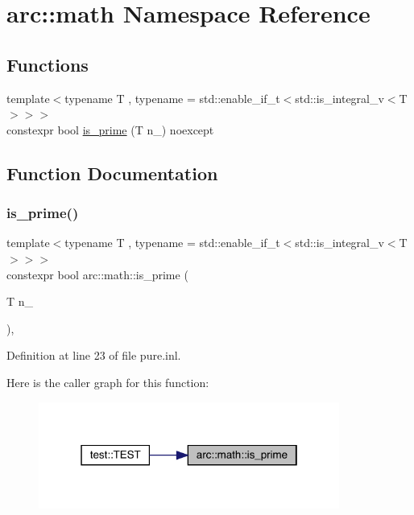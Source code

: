 \hypertarget{namespacearc_1_1math}{}\section{arc\+::math Namespace Reference}
\label{namespacearc_1_1math}
\subsection*{Functions}
\begin{DoxyCompactItemize}
\item 
{\footnotesize template$<$typename T , typename  = std\+::enable\+\_\+if\+\_\+t$<$std\+::is\+\_\+integral\+\_\+v$<$\+T$>$$>$$>$ }\\constexpr bool \mbox{\hyperlink{namespacearc_1_1math_a7ff4593bf0cd78256420945b27713bcc}{is\+\_\+prime}} (T n\+\_\+) noexcept
\end{DoxyCompactItemize}


\subsection{Function Documentation}
\mbox{\label{namespacearc_1_1math_a7ff4593bf0cd78256420945b27713bcc}} 
\subsubsection{\texorpdfstring{is\_prime()}{is\_prime()}}
{\footnotesize\ttfamily template$<$typename T , typename  = std\+::enable\+\_\+if\+\_\+t$<$std\+::is\+\_\+integral\+\_\+v$<$\+T$>$$>$$>$ \\
constexpr bool arc\+::math\+::is\+\_\+prime (\begin{DoxyParamCaption}\item[{T}]{n\+\_\+ }\end{DoxyParamCaption})\hspace{0.3cm}{\ttfamily [inline]}, {\ttfamily [noexcept]}}



Definition at line 23 of file pure.\+inl.

Here is the caller graph for this function\+:
\nopagebreak
\begin{figure}[H]
\begin{center}
\leavevmode
\includegraphics[width=280pt]{namespacearc_1_1math_a7ff4593bf0cd78256420945b27713bcc_icgraph}
\end{center}
\end{figure}
